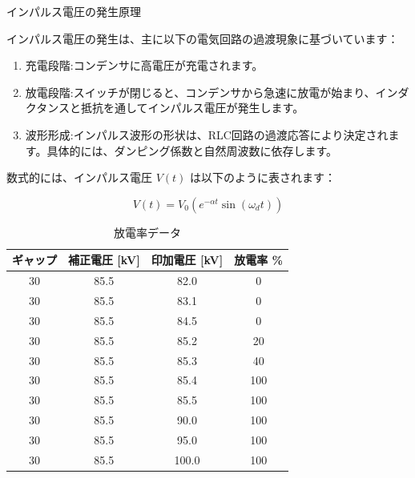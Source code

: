 \documentclass[a4paper,11pt,xelatex,ja=standard]{bxjsarticle}
\begin{document}
                インパルス電圧の発生原理
                
                インパルス電圧の発生は、主に以下の電気回路の過渡現象に基づいています：
                
                \begin{enumerate}
                    \item 充電段階:コンデンサに高電圧が充電されます。
                    \item 放電段階:スイッチが閉じると、コンデンサから急速に放電が始まり、インダクタンスと抵抗を通してインパルス電圧が発生します。
                    \item 波形形成:インパルス波形の形状は、RLC回路の過渡応答により決定されます。具体的には、ダンピング係数と自然周波数に依存します。
                \end{enumerate}
                
                数式的には、インパルス電圧 \( V(t) \) は以下のように表されます：
                
                \[ V(t) = V_0 \left( e^{-\alpha t} \sin(\omega_d t) \right) \]

                \begin{table}[H]
                    \centering
                    \begin{tabular}{|c|c|c|c|}
                        \hline
                        ギャップ & 補正電圧 [kV] & 印加電圧 [kV] & 放電率 \% \\ \hline
                        30 & 85.5 & 82.0 & 0 \\ \hline
                        30 & 85.5 & 83.1 & 0 \\ \hline
                        30 & 85.5 & 84.5 & 0 \\ \hline
                        30 & 85.5 & 85.2 & 20 \\ \hline
                        30 & 85.5 & 85.3 & 40 \\ \hline
                        30 & 85.5 & 85.4 & 100 \\ \hline
                        30 & 85.5 & 85.5 & 100 \\ \hline
                        30 & 85.5 & 90.0 & 100 \\ \hline
                        30 & 85.5 & 95.0 & 100 \\ \hline
                        30 & 85.5 & 100.0 & 100 \\ \hline
                    \end{tabular}
                    \caption{放電率データ}
                \end{table}
\end{document}
